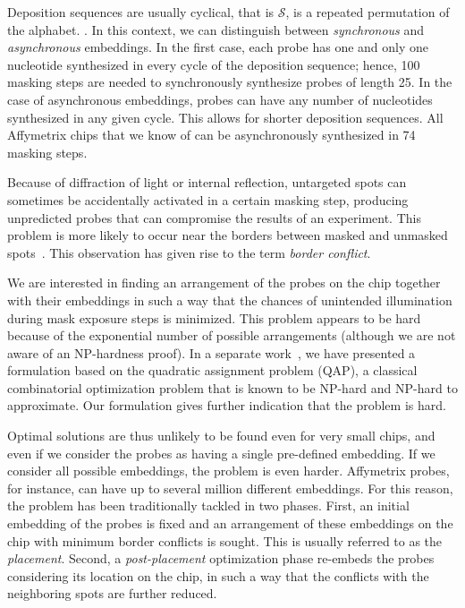 \documentclass{llncs}
\newcommand{\ignore}[1]{}
\begin{document}
Deposition sequences are usually cyclical, that is $\mathcal{S}$, is a repeated
permutation of the alphabet. \ignore{This is mainly because such sequences maximize the
number of possible subsequences \cite{CHASE76}}. In this context, we can
distinguish between \emph{synchronous} and \emph{asynchronous} embeddings. In
the first case, each probe has one and only one nucleotide synthesized in every
cycle of the deposition sequence; hence, 100 masking steps are needed to
synchronously synthesize probes of length 25.
In the case of asynchronous
embeddings, probes can have any number of nucleotides synthesized in any given
cycle. This allows for shorter deposition sequences. All Affymetrix chips that
we know of can be asynchronously synthesized in 74 masking steps.

\ignore{We
understand that Affymetrix uses the same truncated repetition of TGCA to
synthesize most (if not all) GeneChip arrays, which suggests that their probe
selection procedure is restricted to sequences that fit into this deposition
sequence.}

Because of diffraction of light or internal reflection, untargeted spots can
sometimes be accidentally activated in a certain masking step, producing
unpredicted probes that can compromise the results of an experiment. This problem
is more likely to occur near the borders between masked and unmasked
spots~\cite{FODOR91}. This observation has
given rise to the term \emph{border conflict}.

We are interested in finding an arrangement of the probes on the chip together
with their embeddings in such a way that the chances of unintended
illumination during mask exposure steps is minimized. This problem appears to
be hard because of the exponential number of possible arrangements
(although we are not aware of an NP-hardness proof).
In a separate work~\cite{CARVALHO06}, we have presented a formulation based on
the quadratic assignment problem (QAP), a classical combinatorial optimization
problem that is known to be NP-hard and NP-hard to approximate. Our formulation
gives further indication that the problem is hard.

Optimal solutions are thus
unlikely to be found even for very small chips, and even if we consider the probes
as having a single pre-defined embedding.
If we consider all possible embeddings, the problem is even
harder. Affymetrix probes, for instance, can have up to several million different
embeddings. For this reason, the problem has been traditionally tackled in two
phases. First, an initial embedding of the probes is fixed and an arrangement of
these embeddings on the chip with minimum border conflicts is sought. This is
usually referred to as the \emph{placement}. Second, a \emph{post-placement}
optimization phase re-embeds the probes considering its location on the chip,
in such a way that the conflicts with the neighboring spots are further reduced.
\end{document}
